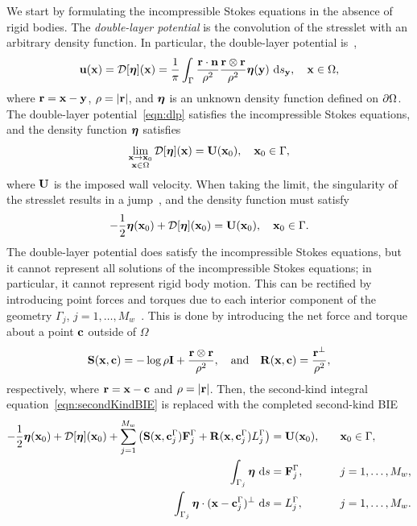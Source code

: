 \documentclass[preprint, 10pt]{elsarticle}
\begin{document}
We start by formulating the incompressible Stokes equations in the
absence of rigid bodies.  The {\em double-layer potential} is the
convolution of the stresslet with an arbitrary density function.  In
particular, the double-layer potential is~\cite{Ladyzhenskaya1963,
Pozrikidis1992},
\begin{align}
  \label{eqn:dlp}
  {\mathbf{u}}({\mathbf{x}}) = {\mathcal{D}}[{\boldsymbol\eta}]({\mathbf{x}}) = \frac{1}{\pi}\int_{\Gamma}
  \frac{{\mathbf{r}}\cdot{\mathbf{n}}}{\rho^2}\frac{{\mathbf{r}} \otimes {\mathbf{r}}}{\rho^2}
  {\boldsymbol\eta}({\mathbf{y}})~\text{d}s_{{\mathbf{y}}}, \quad {\mathbf{x}} \in \Omega,
\end{align}
where ${\mathbf{r}} = {\mathbf{x}} - {\mathbf{y}}$, $\rho=|{\mathbf{r}}|$, and ${\boldsymbol\eta}$ is an unknown density
function defined on ${\partial}\Omega$.  The double-layer
potential~\eqref{eqn:dlp} satisfies the incompressible Stokes equations,
and the density function ${\boldsymbol\eta}$ satisfies
\begin{align*}
  \lim_{\substack{{\mathbf{x}} \rightarrow {\mathbf{x}}_0 \\ {\mathbf{x}} \in \Omega}}
    {\mathcal{D}}[{\boldsymbol\eta}]({\mathbf{x}}) = {\mathbf{U}}({\mathbf{x}}_0), \quad {\mathbf{x}}_0 \in \Gamma,
\end{align*}
where ${\mathbf{U}}$ is the imposed wall velocity.  When taking the limit, the
singularity of the stresslet results in a jump~\cite{Pozrikidis1992},
and the density function must satisfy  
\begin{align}
  -\frac{1}{2} {\boldsymbol\eta}({\mathbf{x}}_0) + {\mathcal{D}}[{\boldsymbol\eta}]({\mathbf{x}}_0) = {\mathbf{U}}({\mathbf{x}}_0), 
    \quad {\mathbf{x}}_0 \in \Gamma.
  \label{eqn:secondKindBIE}
\end{align}
The double-layer potential does satisfy the incompressible Stokes
equations, but it cannot represent all solutions of the incompressible
Stokes equations; in particular, it cannot represent rigid body motion.
This can be rectified by introducing point forces and torques due to
each interior component of the geometry $\Gamma_j$, $j =
1,\ldots,M_w$~\cite{Power1987, Power1993}.  This is done by introducing
the net force and torque about a point ${\mathbf{c}}$ outside of $\Omega$
\begin{align*}
  \mathbf{S}({\mathbf{x}},{\mathbf{c}}) = -\log\rho\mathbf{I} + 
  \frac{{\mathbf{r}} \otimes {\mathbf{r}}}{\rho^2}, \quad \text{and} \quad
  \mathbf{R}({\mathbf{x}},{\mathbf{c}}) = \frac{{\mathbf{r}}^\perp}{\rho^2},
\end{align*}
respectively, where ${\mathbf{r}} = {\mathbf{x}} - {\mathbf{c}}$ and $\rho = |{\mathbf{r}}|$.  Then, the
second-kind integral equation~\eqref{eqn:secondKindBIE} is replaced with
the completed second-kind BIE
\begin{equation}
  \label{eqn:completed_DLP}
  \begin{split}
  -\frac{1}{2}{\boldsymbol\eta}({\mathbf{x}}_0) + {\mathcal{D}}[{\boldsymbol\eta}]({\mathbf{x}}_0) + 
    \sum_{j=1}^{M_w} \left(\mathbf{S}({\mathbf{x}},{\mathbf{c}}^\Gamma_j){\mathbf{F}}^\Gamma_j + 
      \mathbf{R}({\mathbf{x}},{\mathbf{c}}^\Gamma_j)L^\Gamma_j\right) &= {\mathbf{U}}({\mathbf{x}}_0),
      \quad &&{\mathbf{x}}_0 \in \Gamma, \\
  \int_{\Gamma_j} {\boldsymbol\eta}~\text{d}s &= {\mathbf{F}}^\Gamma_j, 
      &&j=1,\ldots,M_w, \\
  \int_{\Gamma_j} {\boldsymbol\eta}\cdot ({\mathbf{x}} - {\mathbf{c}}^\Gamma_j)^\perp~\text{d}s &=   
      L^\Gamma_j, &&j=1,\ldots,M_w.
  \end{split}
\end{equation}
\end{document}
